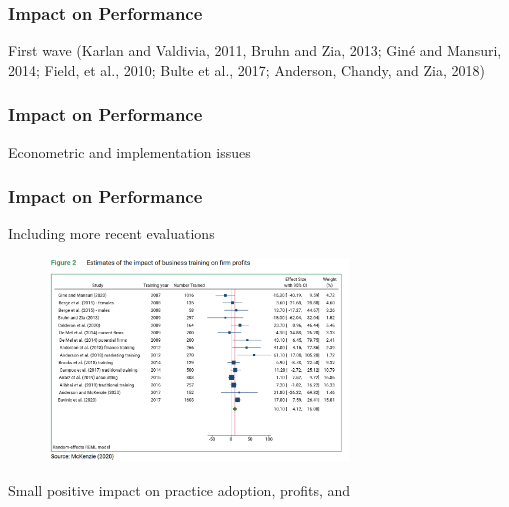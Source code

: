 \documentclass[hideothersubsections, usenames,dvipsnames,11pt]{beamer}
\newenvironment{itemize_2pt}{\itemize\addtolength{\itemsep}{2pt}}{\enditemize}
\begin{document}

\begin{frame}
\frametitle{Impact on Performance}
	\begin{itemize_2pt}
	\item First wave (Karlan and Valdivia, 2011, Bruhn and Zia, 2013; Giné and Mansuri, 2014; Field, et al., 2010; Bulte et al., 2017; Anderson, Chandy, and Zia, 2018)
					 \citep{Karlan2011} \citep{Field2010} \citet{Gine2014} \citep{Bruhn2013} \citep{Bulte2017} \citep{Anderson2018}
	\vspace{0.1in}
	\end{itemize_2pt}
\end{frame}

\begin{frame}
\frametitle{Impact on Performance}
	\begin{itemize_2pt}
	\item Econometric and implementation issues \citep{McKenzie2014}
	\vspace{0.1in}
	\end{itemize_2pt}
\end{frame}

\begin{frame}[label=McK2020_profits]
\frametitle{Impact on Performance}
	
	Including more recent evaluations \citep[see,][]{McKenzie2021}
	
\vspace{-0.5em}	
	
	\begin{figure}[htbp]
		\centering
		\includegraphics[width=21.5em]{pics/McK2020_profits.png}
		\label{McKenzie(2020): Profits}
	\end{figure}	
	
	\vspace{-1em}	
	
	\begin{itemize_2pt}
		\item Small positive impact on practice adoption, profits, and \hyperlink{McK2020_sales}{\beamergotobutton{sales}}
	\end{itemize_2pt}
	
	
\end{frame}
\end{document}
